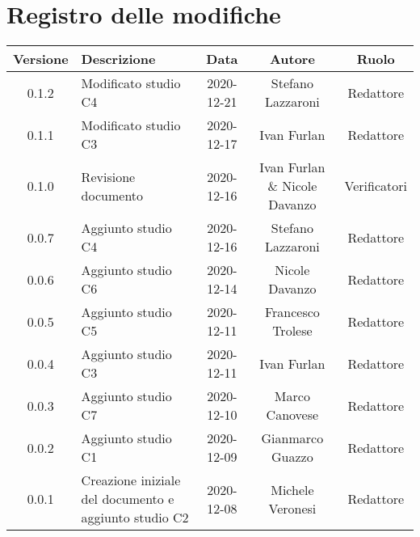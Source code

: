 \section*{Registro delle modifiche}

\begin{center}
	\begin{longtable}{|c|p{5cm}|c|c|c|}
	\hline
	\rowcolor{lighter-grayer}
	\textbf{Versione} & \textbf{Descrizione} & \textbf{Data} & \textbf{Autore} & \textbf{Ruolo} \\
	\hline
	\endfirsthead


	\hline
	0.1.2 & Modificato studio C4 & 2020-12-21 & Stefano Lazzaroni & Redattore \\
	0.1.1 & Modificato studio C3 & 2020-12-17 & Ivan Furlan & Redattore \\
	0.1.0 & Revisione documento & 2020-12-16 & Ivan Furlan \& Nicole Davanzo & Verificatori \\
	0.0.7 & Aggiunto studio C4 & 2020-12-16 & Stefano Lazzaroni & Redattore \\
	0.0.6 & Aggiunto studio C6 & 2020-12-14 & Nicole Davanzo & Redattore \\
	0.0.5 & Aggiunto studio C5 & 2020-12-11 & Francesco Trolese & Redattore \\
	0.0.4 & Aggiunto studio C3 & 2020-12-11 & Ivan Furlan & Redattore \\
	0.0.3 & Aggiunto studio C7 & 2020-12-10 & Marco Canovese & Redattore \\
	0.0.2 & Aggiunto studio C1 & 2020-12-09 & Gianmarco Guazzo & Redattore\\
    0.0.1 & Creazione iniziale del documento e aggiunto studio C2 & 2020-12-08 & Michele Veronesi & Redattore\\
	\hline

	\end{longtable}
\end{center}
